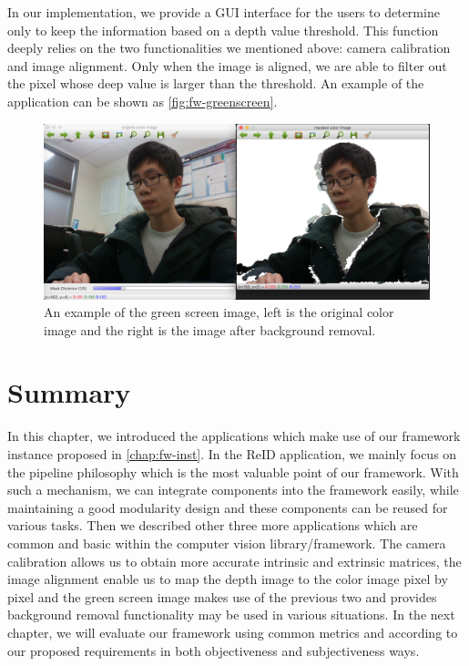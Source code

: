 In our implementation, we provide a GUI interface for the users to determine
only to keep the information based on a depth value threshold. This function
deeply relies on the two functionalities we mentioned above: camera calibration
and image alignment. Only when the image is aligned, we are able to filter out
the pixel whose deep value is larger than the threshold. An example of the
application can be shown as \autoref{fig:fw-greenscreen}.

\begin{figure}
    \includegraphics[width=\linewidth]{figures/framework_greenscreen.png}
    \caption[An example of the green screen image]
    {An example of the green screen image, left is the original color
        image and the right is the image after background removal.}
    \label{fig:fw-greenscreen}
\end{figure}

\section{Summary}

In this chapter, we introduced the applications which make use of our framework
instance proposed in \autoref{chap:fw-inst}. In the ReID application, we mainly
focus on the pipeline philosophy which is the most valuable point of our
framework. With such a  mechanism, we can integrate components into the
framework easily, while maintaining a good modularity design and these
components can be reused for various tasks.
Then we described other three more applications which are common and basic
within the computer vision library/framework. The camera calibration allows us to
obtain more accurate intrinsic and extrinsic matrices, the image alignment
enable us to map the depth image to the color image pixel by pixel and the
green screen image makes use of the previous two and provides background
removal functionality may be used in various situations.
In the next chapter, we will evaluate our framework using common metrics
and according to our proposed requirements in both objectiveness and
subjectiveness ways.


